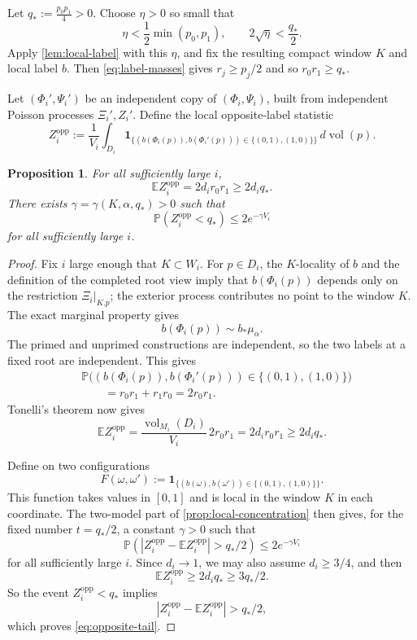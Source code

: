 \documentclass[12pt]{amsart}
\newtheorem{proposition}[proposition]{Proposition}
\theoremstyle{definition}
\newcommand{\vol}{\operatorname{vol}}
\newcommand{\1}{\mathbf 1}
\newcommand{\dd}{\,d}
\begin{document}
Let
$
 q_*:=\frac{p_0p_1}{4}>0.
$
Choose $\eta>0$ so small that
\begin{equation}\label{eq:eta-choice}
 \eta<\frac12\min(p_0,p_1),
 \qquad
 2\sqrt\eta<\frac{q_*}{2}.
\end{equation}
Apply \cref{lem:local-label} with this $\eta$, and fix the resulting compact window $K$ and local label $b$. Then \eqref{eq:label-masses} gives $r_j\geq p_j/2$ and so $r_0r_1\geq q_*$.

Let $(\Phi_i',\Psi_i')$ be an independent copy of $(\Phi_i,\Psi_i)$, built from independent Poisson processes $\Xi_i',Z_i'$. Define the local opposite-label statistic
\begin{equation}\label{eq:Zi}
 Z_i^\mathrm{opp}:=\frac1{V_i}\int_{D_i}
 \1_{\{(b(\Phi_i(p)),b(\Phi_i'(p)))\in\{(0,1),(1,0)\}\}}
 \dd\vol(p).
\end{equation}

\begin{proposition}\label{prop:opposite-label}
For all sufficiently large $i$,
\[
 \mathbb E Z_i^\mathrm{opp}=2d_i r_0r_1\geq2d_i q_*.
\]
There exists $\gamma=\gamma(K,\alpha,q_*)>0$ such that
\begin{equation}\label{eq:opposite-tail}
 \mathbb P(Z_i^\mathrm{opp}<q_*)\leq2e^{-\gamma V_i}
\end{equation}
for all sufficiently large $i$.
\end{proposition}

\begin{proof}
Fix $i$ large enough that $K\subset W_i$. For $p\in D_i$, the $K$-locality of $b$ and the definition of the completed root view imply that $b(\Phi_i(p))$ depends only on the restriction $\Xi_i|_{K.p}$; the exterior process contributes no point to the window $K$. The exact marginal property gives
\[
 b(\Phi_i(p))\sim b_*\mu_\alpha.
\]
The primed and unprimed constructions are independent, so the two labels at a fixed root are independent. This gives
\begin{align*}
 &\mathbb P\bigl((b(\Phi_i(p)),b(\Phi_i'(p)))
 \in\{(0,1),(1,0)\}\bigr)\\
 &\qquad=r_0r_1+r_1r_0=2r_0r_1.
\end{align*}
Tonelli's theorem now gives
\[
 \mathbb E Z_i^{\mathrm{opp}}
 =\frac{\vol_{M_i}(D_i)}{V_i}\,2r_0r_1
 =2d_i r_0r_1\geq2d_i q_*.
\]

Define on two configurations
\[
 F(\omega,\omega')
 :=\1_{\{(b(\omega),b(\omega'))\in\{(0,1),(1,0)\}\}}.
\]
This function takes values in $[0,1]$ and is local in the window $K$ in each coordinate. The two-model part of \cref{prop:local-concentration} then gives, for the fixed number $t=q_*/2$, a constant $\gamma>0$ such that
\[
 \mathbb P\left(
 |Z_i^{\mathrm{opp}}-\mathbb E Z_i^{\mathrm{opp}}|>q_*/2
 \right)\leq2e^{-\gamma V_i}
\]
for all sufficiently large $i$. Since $d_i\to1$, we may also assume $d_i\geq3/4$, and then
\[
 \mathbb E Z_i^{\mathrm{opp}}\geq2d_i q_*\geq3q_*/2.
\]
So the event $Z_i^{\mathrm{opp}}<q_*$ implies
\[
 |Z_i^{\mathrm{opp}}-\mathbb E Z_i^{\mathrm{opp}}|>q_*/2,
\]
which proves \eqref{eq:opposite-tail}.
\end{proof}
\end{document}
